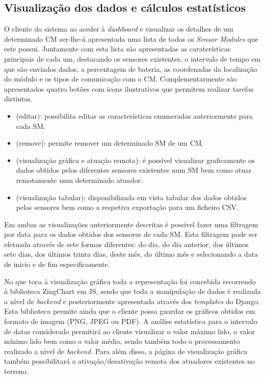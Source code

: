 \newpage
\subsection{Visualização dos dados e cálculos estatísticos}

O cliente do sistema ao aceder à \textit{dashboard} e visualizar os detalhes de um determinado \acl{CM} ser-lhe-á apresentada uma lista de todos os \textit{Sensor Modules} que este possui. Juntamente com esta lista são apresentadas as caraterísticas principais de cada um, destacando os sensores existentes, o intervalo de tempo em que são enviados dados, a percentagem de bateria, as coordenadas da localização do módulo e os tipos de comunicação com o \acl{CM}. Complementarmente são apresentados quatro botões com icons ilustrativos que permitem realizar tarefas distintas.  

\begin{itemize}
	\item \faEdit \space (editar): possibilita editar as características enumeradas anteriormente para cada \acl{SM}. 
	\item \faTrash \space (remove): permite remover um determinado \acl{SM} de um \acl{CM}. 
	\item \faBarChart \faCogs \space (visualização gráfica e atuação remota): é possível visualizar graficamente os dados obtidos pelos diferentes sensores existentes num \acl{SM} bem como atuar remotamente num determinado atuador. 
	\item \faDatabase \space (visualização tabular): disponibilizada em vista tabular dos dados obtidos pelos sensores bem como a respetiva exportação para um ficheiro \ac{CSV}. 
\end{itemize}


Em ambas as visualizações anteriormente descritas é possível fazer uma filtragem por data para os dados obtidos dos sensores de cada \acl{SM}. Esta filtragem pode ser efetuada através de sete formas diferentes: do dia, do dia anterior, dos últimos sete dias, dos últimos trinta dias, deste mês, do último mês e selecionando a data de início e de fim especificamente. 


No que toca à visualização gráfica toda a representação foi concebida recorrendo à biblioteca ZingChart em \ac{JS}, sendo que toda a manipulação de dados é realizada a nível de \textit{backend} e posteriormente apresentada através dos \textit{templates} do Django. Esta biblioteca permite ainda que o cliente possa guardar os gráficos obtidos em formato de imagem (PNG, JPEG ou PDF).  A análise estatística para o intervalo de datas considerado permitirá ao cliente visualizar o valor máximo lido, o valor mínimo lido bem como o valor médio, sendo também todo o processamento realizado a nível de \textit{backend}. Para além disso, a página de visualização gráfica também possibilitará a ativação/desativação remota dos atuadores existentes no terreno. 


